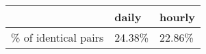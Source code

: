 \begin{tabular}{lll}
\toprule
{} &    daily &   hourly \\
\midrule
\% of identical pairs &  24.38\% &  22.86\% \\
\bottomrule
\end{tabular}
